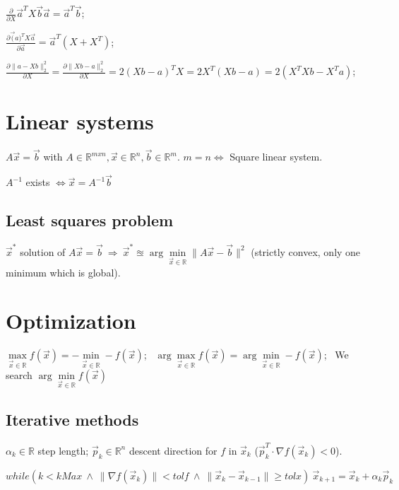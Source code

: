 \documentclass[]{article}
\begin{document}
	$\frac{\partial}{\partial X} \vec{a}^T X \vec{b} \vec{a} = \vec{a}^T \vec{b}$;
	
	$\frac{\partial \vec(a)^T X \vec{a}}{\partial \vec{a}} = \vec{a}^T (X + X^T)$;
	
	$\frac{\partial \lVert a-Xb\rVert_2^2}{\partial X} = \frac{\partial \lVert Xb-a\rVert_2^2}{\partial X} = 2(Xb-a)^T X = 2 X^T (Xb-a) = 2(X^T X b - X^T a)$;

	\section{Linear systems}
	
	$A\vec{x} = \vec{b}$ with $A \in \mathbb{R}^{mxn}, \vec{x} \in \mathbb{R}^n, \vec{b} \in \mathbb{R}^m$.
	$m=n \Leftrightarrow$ Square linear system.
	
	$A^{-1}$ exists $\iff \vec{x} = A^{-1} \vec{b}$
	
	\subsection{Least squares problem}
	
	$\vec{x}^*$ solution of $A \vec{x} = \vec{b} \ \Rightarrow \ \vec{x}^* \approxeq \arg\min\limits_{\vec{x}\in \mathbb{R}}\lVert A \vec{x} - \vec{b} \rVert^2$ (strictly convex, only one minimum which is global).
	
	\section{Optimization}
	
	$\max\limits_{\vec{x}\in\mathbb{R}} f(\vec{x}) = -\min\limits_{\vec{x}\in\mathbb{R}} -f(\vec{x})$; \ 
	$\arg\max\limits_{\vec{x}\in\mathbb{R}} f(\vec{x}) = \arg\min\limits_{\vec{x}\in\mathbb{R}} -f(\vec{x})$; \ 
	We search $\arg\min\limits_{\vec{x}\in\mathbb{R}} f(\vec{x})$
	
	\subsection{Iterative methods}
	
	$\alpha_k \in \mathbb{R}$ step length; $\vec{p}_k \in \mathbb{R}^n$ descent direction for $f$ in $\vec{x}_k$ ($\vec{p}_k^T \cdot \nabla f(\vec{x}_k) < 0$).
	
	$while ( k < kMax \ \land \ \lVert \nabla f(\vec{x}_k) \rVert < tolf \ \land \ \lVert \vec{x}_k - \vec{x}_{k-1} \rVert \ge tolx ) \  \vec{x}_{k+1} = \vec{x}_k + \alpha_k \vec{p}_k$
	
\end{document}
